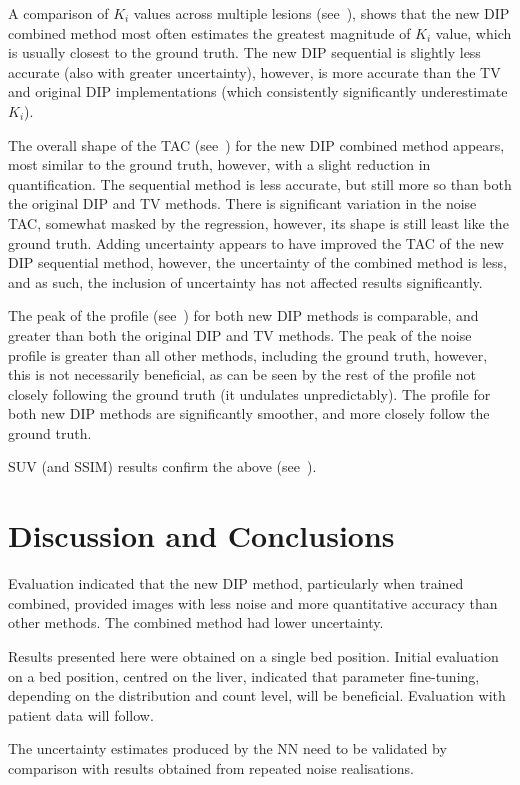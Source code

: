     A comparison of $K_i$ values across multiple lesions (see~), shows that the new \gls{DIP} combined method most often estimates the greatest magnitude of $K_i$ value, which is usually closest to the ground truth. The new \gls{DIP} sequential is slightly less accurate (also with greater uncertainty), however, is more accurate than the \gls{TV} and original \gls{DIP} implementations (which consistently significantly underestimate $K_i$).
    
    The overall shape of the \gls{TAC} (see~) for the new \gls{DIP} combined method appears, most similar to the ground truth, however, with a slight reduction in quantification. The sequential method is less accurate, but still more so than both the original \gls{DIP} and \gls{TV} methods. There is significant variation in the noise \gls{TAC}, somewhat masked by the regression, however, its shape is still least like the ground truth. Adding uncertainty appears to have improved the \gls{TAC} of the new \gls{DIP} sequential method, however, the uncertainty of the combined method is less, and as such, the inclusion of uncertainty has not affected results significantly.
    
    The peak of the profile (see~) for both new \gls{DIP} methods is comparable, and greater than both the original \gls{DIP} and \gls{TV} methods. The peak of the noise profile is greater than all other methods, including the ground truth, however, this is not necessarily beneficial, as can be seen by the rest of the profile not closely following the ground truth (it undulates unpredictably). The profile for both new \gls{DIP} methods are significantly smoother, and more closely follow the ground truth.
     
    \acrshort{SUV} (and \acrshort{SSIM}) results confirm the above (see~).


\section{Discussion and Conclusions} \label{sec:discussion_and_conclusions}

    Evaluation indicated that the new \gls{DIP} method, particularly when trained combined, provided images with less noise and more quantitative accuracy than other methods. The combined method had lower uncertainty.

    Results presented here were obtained on a single bed position. Initial evaluation on a bed position, centred on the liver, indicated that parameter fine-tuning, depending on the distribution and count level, will be beneficial. Evaluation with patient data will follow.
    
    The uncertainty estimates produced by the \gls{NN} need to be validated by comparison with results obtained from repeated noise realisations.
    
